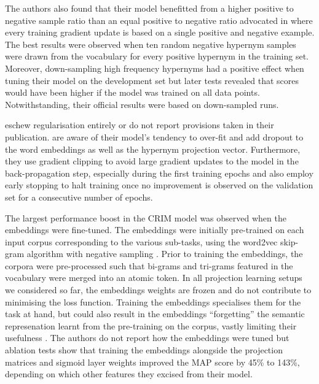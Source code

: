 The authors also found that their model benefitted from a higher positive to negative sample ratio than an equal positive to negative ratio advocated in \citep{yamane2016distributional} where every training gradient update is based on a single positive and negative example.  The best results were observed when ten random negative hypernym samples were drawn from the vocabulary for every positive hypernym in the training set.  Moreover, down-sampling high frequency hypernyms had a positive effect when tuning their model on the development set but later tests revealed that scores would have been higher if the model was trained on all data points.  Notwithstanding, their official results were based on down-sampled runs.

\citet{yamane2016distributional} eschew regularisation entirely or do not report provisions taken in their publication.  \citeauthor{bernier2018crim} are aware of their model’s tendency to over-fit and add dropout to the word embeddings as well as the hypernym projection vector.  Furthermore, they use gradient clipping to avoid large gradient updates to the model in the back-propagation step, especially during the first training epochs and also employ early stopping to halt training once no improvement is observed on the validation set for a consecutive number of epochs.

The largest performance boost in the CRIM model was observed when the embeddings were fine-tuned.  The embeddings were initially pre-trained on each input corpus corresponding to the various sub-tasks, using the word2vec skip-gram algorithm with negative sampling \citep{mikolov2013efficient}.  Prior to training the embeddings, the corpora were pre-processed such that bi-grams and tri-grams featured in the vocabulary were merged into an atomic token.  In all projection learning setups we considered so far, the embeddings weights are frozen and do not contribute to minimising the loss function.  Training the embeddings specialises them for the task at hand, but could also result in the embeddings ``forgetting'' the semantic represenation learnt from the pre-training on the corpus, vastly limiting their usefulness \citep{howard2018universal}.  The authors do not report how the embeddings were tuned but ablation tests show that training the embeddings alongside the projection matrices and sigmoid layer weights improved the \ac{MAP} score by 45\% to 143\%, depending on which other features they excised from their model.

